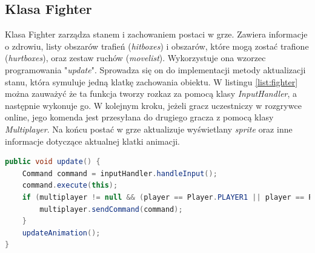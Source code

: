 \subsection{Klasa Fighter}
Klasa Fighter zarządza stanem i zachowaniem postaci w grze. Zawiera informacje o zdrowiu, listy obszarów trafień (\emph{hitboxes}) i obszarów, które mogą zostać trafione (\emph{hurtboxes}), oraz zestaw ruchów (\emph{movelist}). Wykorzystuje ona wzorzec programowania "\emph{update}". Sprowadza się on do implementacji metody aktualizacji stanu, która symuluje jedną klatkę zachowania obiektu. W listingu \ref{list:fighter} można zauważyć że ta funkcja tworzy rozkaz za pomocą klasy \emph{InputHandler}, a następnie wykonuje go. W kolejnym kroku, jeżeli gracz uczestniczy w rozgrywce online, jego komenda jest przesyłana do drugiego gracza z pomocą klasy \emph{Multiplayer}. Na końcu postać w grze aktualizuje wyświetlany \emph{sprite} oraz inne informacje dotyczące aktualnej klatki animacji.

\begin{lstlisting}[language=Java,style=JavaStyle,label=list:fighter,caption=Funkcja update w klasie Fighter,
                   basicstyle=\footnotesize\ttfamily]
public void update() {
    Command command = inputHandler.handleInput();
    command.execute(this);
    if (multiplayer != null && (player == Player.PLAYER1 || player == Player.PLAYER2)) {
        multiplayer.sendCommand(command);
    }
    updateAnimation();
}
\end{lstlisting}

